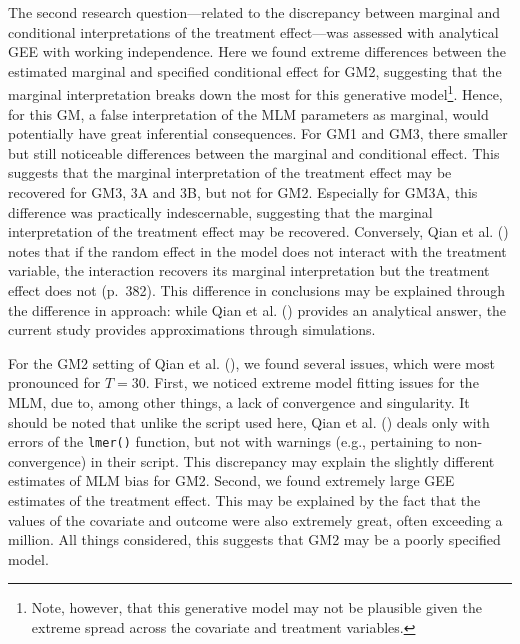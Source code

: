 \documentclass[
  12pt,
  a4paper,
]{article}
\begin{document}
The second research question---related to the discrepancy between
marginal and conditional interpretations of the treatment effect---was
assessed with analytical GEE with working independence. Here we found
extreme differences between the estimated marginal and specified
conditional effect for GM2, suggesting that the marginal interpretation
breaks down the most for this generative model\footnote{Note, however,
  that this generative model may not be plausible given the extreme
  spread across the covariate and treatment variables.}. Hence, for this
GM, a false interpretation of the MLM parameters as marginal, would
potentially have great inferential consequences. For GM1 and GM3, there
smaller but still noticeable differences between the marginal and
conditional effect. This suggests that the marginal interpretation of
the treatment effect may be recovered for GM3, 3A and 3B, but not for
GM2. Especially for GM3A, this difference was practically indescernable,
suggesting that the marginal interpretation of the treatment effect may
be recovered. Conversely, Qian et al. ()
notes that if the random effect in the model does not interact with the
treatment variable, the interaction recovers its marginal interpretation
but the treatment effect does not (p.~382). This difference in
conclusions may be explained through the difference in approach: while
Qian et al. () provides an analytical
answer, the current study provides approximations through simulations.

For the GM2 setting of Qian et al. (), we
found several issues, which were most pronounced for \(T = 30\). First,
we noticed extreme model fitting issues for the MLM, due to, among other
things, a lack of convergence and singularity. It should be noted that
unlike the script used here, Qian et al. ()
deals only with errors of the \texttt{lmer()} function, but not with
warnings (e.g., pertaining to non-convergence) in their script. This
discrepancy may explain the slightly different estimates of MLM bias for
GM2. Second, we found extremely large GEE estimates of the treatment
effect. This may be explained by the fact that the values of the
covariate and outcome were also extremely great, often exceeding a
million. All things considered, this suggests that GM2 may be a poorly
specified model.
\end{document}
